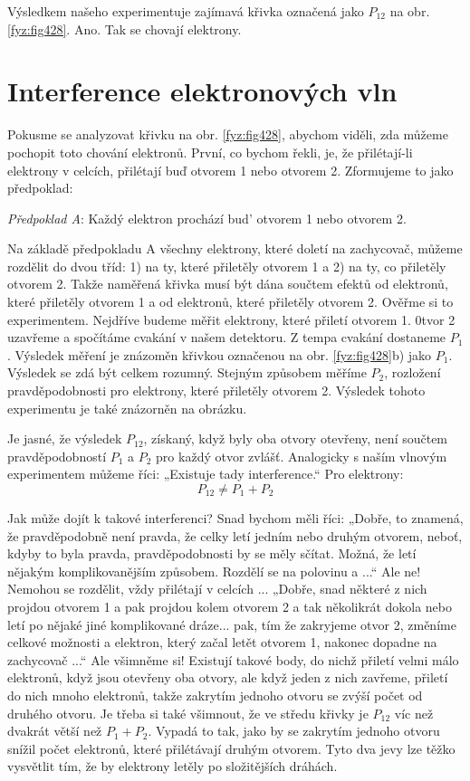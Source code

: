     Výsledkem našeho experimentuje zajímavá křivka označená jako \(P_{12}\) na obr.
    \ref{fyz:fig428}. Ano. Tak se chovají elektrony.

  \section{Interference elektronových vln}\label{fyz:IchapXXXVIIsecV}
    Pokusme se analyzovat křivku na obr. \ref{fyz:fig428}, abychom viděli, zda můžeme pochopit toto
    chování elektronů. První, co bychom řekli, je, že přilétají-li elektrony v celcích, přilétají
    buď otvorem 1 nebo otvorem 2. Zformujeme to jako předpoklad:
    
    \emph{Předpoklad A}: Každý elektron prochází bud' otvorem 1 nebo otvorem 2.
    
    Na základě předpokladu A všechny elektrony, které doletí na zachycovač, můžeme rozdělit do dvou
    tříd: 1) na ty, které přiletěly otvorem 1 a 2) na ty, co přiletěly otvorem 2. Takže naměřená
    křivka musí být dána součtem efektů od elektronů, které přiletěly otvorem 1 a od elektronů,
    které přiletěly otvorem 2. Ověřme si to experimentem. Nejdříve budeme měřit elektrony, které
    přiletí otvorem 1. 0tvor 2 uzavřeme a spočítáme cvakání v našem detektoru. Z tempa cvakání
    dostaneme \(P_1\). Výsledek měření je znázoměn křivkou označenou na obr. \ref{fyz:fig428}b) jako
    \(P_1\). Výsledek se zdá být celkem rozumný. Stejným způsobem měříme \(P_2\), rozložení
    pravděpodobnosti pro elektrony, které přiletěly otvorem 2. Výsledek tohoto experimentu je také
    znázorněn na obrázku.
    
    Je jasné, že výsledek \(P_{12}\), získaný, když byly oba otvory otevřeny, není součtem
    pravděpodobností \(P_1\) a \(P_2\) pro každý otvor zvlášť. Analogicky s naším vlnovým
    experimentem můžeme říci: „Existuje tady interference.“ Pro elektrony:
    \begin{equation*}
      P_{12} \neq P_1 + P_2
    \end{equation*}

    Jak může dojít k takové interferenci? Snad bychom měli říci: „Dobře, to znamená, že
    pravděpodobně není pravda, že celky letí jedním nebo druhým otvorem, neboť, kdyby to byla
    pravda, pravděpodobnosti by se měly sčítat. Možná, že letí nějakým komplikovanějším způsobem.
    Rozdělí se na polovinu a ...“ Ale ne! Nemohou se rozdělit, vždy přilétají v celcích ... „Dobře,
    snad některé z nich projdou otvorem 1 a pak projdou kolem otvorem 2 a tak několikrát dokola nebo
    letí po nějaké jiné komplikované dráze... pak, tím že zakryjeme otvor 2, změníme celkové
    možnosti a elektron, který začal letět otvorem 1, nakonec dopadne na zachycovač ...“ Ale
    všimněme si! Existují takové body, do nichž přiletí velmi málo elektronů, když jsou otevřeny oba
    otvory, ale když jeden z nich zavřeme, přiletí do nich mnoho elektronů, takže zakrytím jednoho
    otvoru se zvýší počet od druhého otvoru. Je třeba si také všimnout, že ve středu křivky je
    \(P_{12}\) víc než dvakrát větší než \(P_1+P_2\). Vypadá to tak, jako by se zakrytím jednoho
    otvoru snížil počet elektronů, které přilétávají druhým otvorem. Tyto dva jevy lze těžko
    vysvětlit tím, že by elektrony letěly po složitějších dráhách.
    
